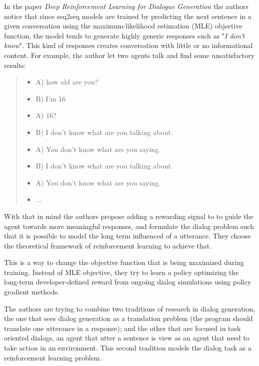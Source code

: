 In the paper \textit{Deep Reinforcement Learning for Dialogue Generation} \cite{Li:2016} the authors notice that since seq2seq models are trained by predicting the next sentence in a given conversation using the maximum-likelihood estimation (MLE) objective function, the model tends to generate  highly generic responses such as "\textit{I don't know}". This kind of responses creates conversation with little or no informational content. For example, the author let two agents talk and find some unsatisfactory results:

\begin{quote}
\begin{itemize}
\item[] A) how old are you?
\item[] B) I'm 16
\item[] A) 16?
\item[] B) I don't know what are you talking about.
\item[] A) You don't know what are you saying.
\item[] B) I don't know what are you talking about.
\item[] A) You don't know what are you saying.
\item[] $\dots$
\end{itemize}
\end{quote}

With that in mind the authors propose adding a rewarding signal to to guide the agent towards more meaningful responses, and formulate the dialog problem such that it is possible to model the long term influenced of a utterance. They choose the theoretical framework of reinforcement learning to achieve that.

\par This is a way to change the objective function that is being maximized during training. Instead of MLE objective, they try to learn a policy optimizing the long-term developer-defined reward from ongoing dialog simulations using policy gradient methods.

\par The authors are trying to combine two traditions of research in dialog generation, the one that sees dialog generation as a translation problem (the program should translate one utterance in a response); and the other that are focused in task oriented dialogs, an agent that utter a sentence is view as an agent that need to take action in an environment. This second tradition models the dialog task as a reinforcement learning problem. 



